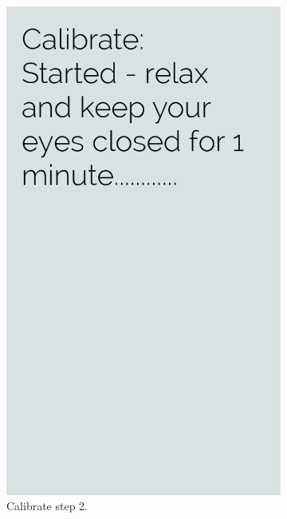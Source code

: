 \documentclass[a4paper,10pt,english,lof,lot,twoside]{puthesis}
\begin{document}
\begin{figure}
\begin{subfigure}[t]{0.30\linewidth}
\includegraphics[width=0.800\linewidth]{final-prototype-calibrate-step-2.png}
\caption[Calibrate step 2]{Calibrate step 2.}\label{ch-design/index:fig-final-prototype-app-flow-calibrate-step-2}\end{subfigure}
\begin{subfigure}[t]{0.30\linewidth}
\centering
\capstart


\end{subfigure}
\end{figure}
\end{document}
